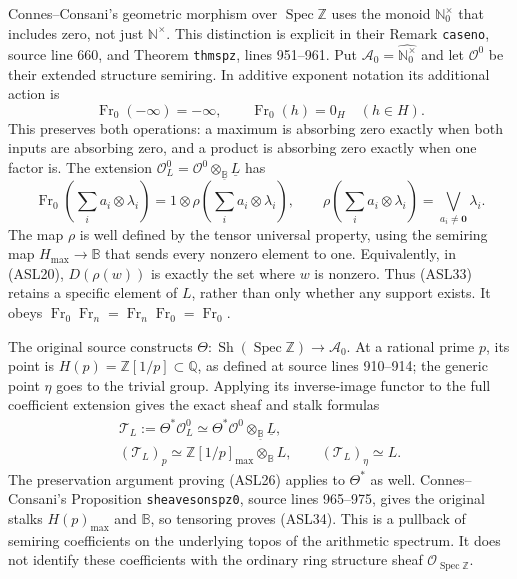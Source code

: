 Connes--Consani's geometric morphism over $\operatorname{Spec}\mathbb Z$
uses the monoid $\mathbb N_0^\times$ that includes zero, not just
$\mathbb N^\times$. This distinction is explicit in their Remark
\texttt{caseno}, source line 660, and Theorem \texttt{thmspz}, lines
951--961. Put $\mathscr A_0=\widehat{\mathbb N_0^\times}$ and let
$\mathcal O^0$ be their extended structure semiring. In additive
exponent notation its additional action is
\begin{equation}\tag{ASL32}
 \operatorname{Fr}_0(-\infty)=-\infty,\qquad
 \operatorname{Fr}_0(h)=0_H\quad(h\in H).
\end{equation}
This preserves both operations: a maximum is absorbing zero exactly
when both inputs are absorbing zero, and a product is absorbing zero
exactly when one factor is. The extension
$\mathcal O^0_L=\mathcal O^0\otimes_{\underline{\mathbb B}}
\underline L$ has
\begin{equation}\tag{ASL33}
 \operatorname{Fr}_0\!\left(\sum_i a_i\otimes\lambda_i\right)
 =1\otimes\rho\!\left(\sum_i a_i\otimes\lambda_i\right),
 \qquad
 \rho\!\left(\sum_i a_i\otimes\lambda_i\right)
       =\bigvee_{a_i\ne\mathbf0}\lambda_i.
\end{equation}
The map $\rho$ is well defined by the tensor universal property,
using the semiring map $H_{\max}\to\mathbb B$ that sends every
nonzero element to one. Equivalently, in (ASL20), $D(\rho(w))$
is exactly the set where $w$ is nonzero. Thus (ASL33) retains a
specific element of $L$, rather than only whether any support exists.
It obeys $\operatorname{Fr}_0\operatorname{Fr}_n
=\operatorname{Fr}_n\operatorname{Fr}_0=\operatorname{Fr}_0$.

The original source constructs
$\Theta:\operatorname{Sh}(\operatorname{Spec}\mathbb Z)
\to\mathscr A_0$. At a rational prime $p$, its point is
$H(p)=\mathbb Z[1/p]\subset\mathbb Q$, as defined at source lines
910--914; the generic point $\eta$ goes to the trivial group.
Applying its inverse-image functor to the full coefficient extension
gives the exact sheaf and stalk formulas
\begin{equation}\tag{ASL34}
 \begin{gathered}
 \mathcal T_L:=\Theta^*\mathcal O^0_L
   \simeq\Theta^*\mathcal O^0\otimes_{\underline{\mathbb B}}
                \underline L,\\
 (\mathcal T_L)_p\simeq
      \mathbb Z[1/p]_{\max}\otimes_{\mathbb B}L,
 \qquad (\mathcal T_L)_\eta\simeq L.
 \end{gathered}
\end{equation}
The preservation argument proving (ASL26) applies to $\Theta^*$ as
well. Connes--Consani's Proposition \texttt{sheavesonspz0}, source
lines 965--975, gives the original stalks $H(p)_{\max}$ and
$\mathbb B$, so tensoring proves (ASL34). This is a pullback of
semiring coefficients on the underlying topos of the arithmetic
spectrum. It does not identify these coefficients with the ordinary
ring structure sheaf $\mathcal O_{\operatorname{Spec}\mathbb Z}$.

